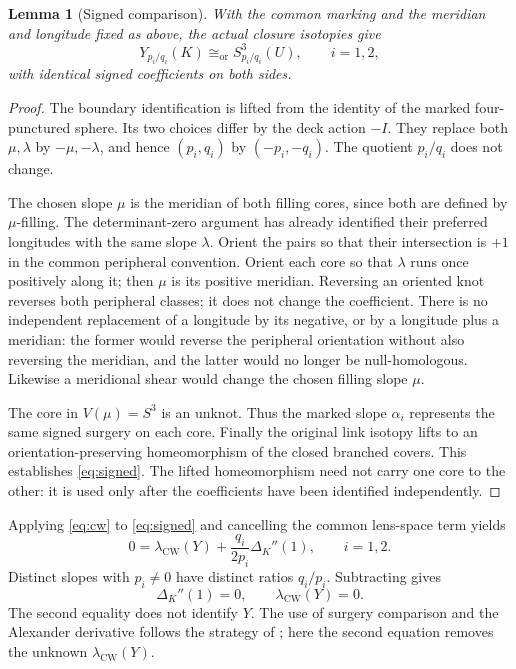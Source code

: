 \documentclass[11pt]{amsart}
\newtheorem{lemma}[theorem]{Lemma}
\theoremstyle{definition}
\theoremstyle{remark}
\newcommand{\lCW}{\lambda_{\mathrm{CW}}}
\newcommand{\iso}{\cong_{\mathrm{or}}}
\begin{document}
\begin{lemma}[Signed comparison]\label{lem:signs}
With the common marking and the meridian and
longitude fixed as above, the actual closure
isotopies give
\begin{equation}\label{eq:signed}
 Y_{p_i/q_i}(K)\iso S^3_{p_i/q_i}(U),\qquad i=1,2,
\end{equation}
with identical signed coefficients on both sides.
\end{lemma}
\begin{proof}
The boundary identification is lifted from the
identity of the marked four-punctured sphere.
Its two choices differ by the deck action \(-I\).
They replace both \(\mu,\lambda\) by
\(-\mu,-\lambda\), and hence \((p_i,q_i)\) by
\((-p_i,-q_i)\). The quotient \(p_i/q_i\)
does not change.

The chosen slope \(\mu\) is the meridian of
both filling cores, since both are defined by
\(\mu\)-filling. The determinant-zero argument
has already identified their preferred
longitudes with the same slope \(\lambda\).
Orient the pairs so that their intersection is
\(+1\) in the common peripheral convention. Orient each core
so that \(\lambda\) runs once positively along it; then \(\mu\)
is its positive meridian.
Reversing an oriented knot reverses both
peripheral classes; it does not change the
coefficient. There is no independent replacement
of a longitude by its negative, or by a
longitude plus a meridian: the former would
reverse the peripheral orientation without
also reversing the meridian, and the latter
would no longer be null-homologous.
Likewise a meridional shear would change
the chosen filling slope \(\mu\).

The core in \(V(\mu)=S^3\) is an unknot.
Thus the marked slope \(\alpha_i\) represents
the same signed surgery on each core.
Finally the original link isotopy lifts to
an orientation-preserving homeomorphism of
the closed branched covers. This establishes
\eqref{eq:signed}. The lifted homeomorphism
need not carry one core to the other: it is
used only after the coefficients have been
identified independently.
\end{proof}

Applying \eqref{eq:cw} to \eqref{eq:signed} and
cancelling the common lens-space term yields
\begin{equation}\label{eq:twoCW}
 0=\lCW(Y)+\frac{q_i}{2p_i}\Delta_K''(1),
 \qquad i=1,2.
\end{equation}
Distinct slopes with \(p_i\ne0\) have distinct
ratios \(q_i/p_i\). Subtracting gives
\begin{equation}\label{eq:zeroderivative}
 \Delta_K''(1)=0,\qquad \lCW(Y)=0.
\end{equation}
The second equality does not identify \(Y\).
The use of surgery comparison and the
Alexander derivative follows the strategy
of \cite[Theorem~8.2 and its proof]{Gainullin};
here the second equation removes the
unknown \(\lCW(Y)\).
\end{document}
